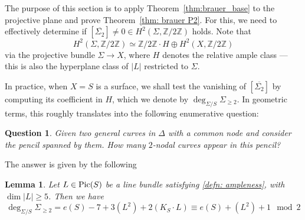 \documentclass[11pt]{amsart}
\theoremstyle{plain}
\newtheorem{lem}[thm]{Lemma}
\newtheorem{question}[thm]{Question}
\theoremstyle{definition}
\theoremstyle{remark}
\newcommand{\Pic}{\mathop{\rm Pic}\nolimits}
\begin{document}
The purpose of this section is to apply Theorem~\ref{thm:brauer_base} to the projective plane and prove Theorem~\ref{thm: brauer P2}. For this, we need to effectively determine if $[\overline{\Sigma_{2}}] \neq 0 \in H^2(\Sigma, \mathbb Z/ 2\mathbb Z)$ holds. Note that
\[
H^2(\Sigma, \mathbb Z/ 2\mathbb Z) \simeq \mathbb Z/ 2\mathbb Z \cdot H \oplus H^2(X, \mathbb Z/2\mathbb Z)
\]
via the projective bundle $\Sigma \to X$, where $H$ denotes the relative ample class ---  this is also the hyperplane class of $|L|$ restricted to $\Sigma$.

\smallskip

In practice, when $X=S$ is a {surface}, we shall test the vanishing of $[\overline{\Sigma_{2}}]$ by computing its coefficient in $H$, which we denote by $\deg_{\Sigma/S} \Sigma_{\geq 2}$. In geometric terms, this roughly translates into the following enumerative question:

\begin{question}
    Given two general curves in $\Delta$ with a common node and consider the pencil spanned by them. How many $2$-nodal curves appear in this pencil?
\end{question}

The answer is given by the following

\begin{lem}\label{lemma: relative degree}
    Let $L \in \Pic(S)$ be a line bundle satisfying \ref{defn: ampleness}, with $\dim |L| \geq 5$. Then we have
    $$\deg_{\Sigma/S} \Sigma_{\geq 2} = e(S) - 7 + 3 (L^2) + 2 (K_S \cdot L) \equiv e(S) + (L^2) + 1 \mod 2$$
\end{lem}
\end{document}
